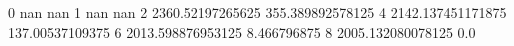 0 nan nan
1 nan nan
2 2360.52197265625 355.389892578125
4 2142.137451171875 137.00537109375
6 2013.598876953125 8.466796875
8 2005.132080078125 0.0
